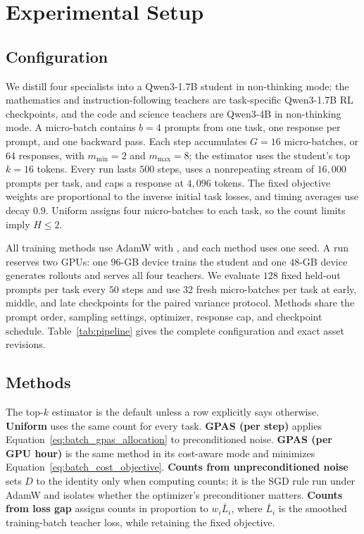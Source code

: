 \section{Experimental Setup}
\label{sec:experiments}

\subsection{Configuration}

We distill four specialists into a Qwen3-1.7B student in non-thinking mode:
the mathematics and instruction-following teachers are task-specific
Qwen3-1.7B RL checkpoints, and the code and science teachers are Qwen3-4B in
non-thinking mode. A micro-batch contains $b=4$ prompts from one task, one
response per prompt, and one backward pass. Each step accumulates $G=16$
micro-batches, or $64$ responses, with $m_{\min}=2$ and $m_{\max}=8$; the
estimator uses the student's top $k=16$ tokens. Every run lasts $500$ steps,
uses a nonrepeating stream of $16{,}000$ prompts per task, and caps a response
at $4{,}096$ tokens. The fixed objective weights are proportional to the
inverse initial task losses, and timing averages use decay $0.9$. Uniform
assigns four micro-batches to each task, so the count limits imply $H\leq2$.

All training methods use AdamW with , and each method uses one seed. A run reserves two GPUs: one
$96$-GB device trains the student and one $48$-GB device generates rollouts
and serves all four teachers. We evaluate $128$ fixed held-out prompts per
task every $50$ steps and use $32$ fresh micro-batches per task at early,
middle, and late checkpoints for the paired variance protocol. Methods share
the prompt order, sampling settings, optimizer, response cap, and checkpoint
schedule. Table~\ref{tab:pipeline} gives the complete configuration and exact
asset revisions.

\subsection{Methods}

The top-$k$ estimator is the default unless a row explicitly says otherwise.
\textbf{Uniform} uses the same count for every task.
\textbf{GPAS (per step)} applies
Equation~\ref{eq:batch_gpas_allocation} to preconditioned noise.
\textbf{GPAS (per GPU hour)} is the same method in its cost-aware mode and
minimizes Equation~\ref{eq:batch_cost_objective}.
\textbf{Counts from unpreconditioned noise} sets $D$ to the identity only when
computing counts; it is the SGD rule run under AdamW and isolates whether the
optimizer's preconditioner matters.
\textbf{Counts from loss gap} assigns counts in proportion to
$w_i\bar L_i$, where $\bar L_i$ is the smoothed training-batch teacher loss,
while retaining the fixed objective.

